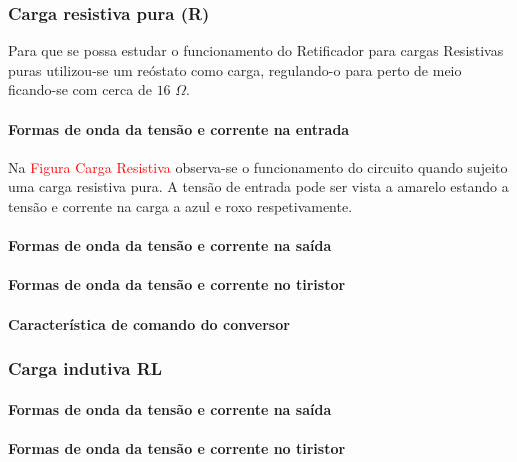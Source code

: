 \documentclass[a4paper,11pt]{article}
\numberwithin{equation}{section}
\begin{document}
\subsubsection{Carga resistiva pura (R)}

Para que se possa estudar o funcionamento do Retificador para cargas Resistivas puras utilizou-se um reóstato como carga, regulando-o para perto de meio ficando-se com cerca de $16$ $\Omega$.

\paragraph{Formas de onda da tensão e corrente na entrada}


Na \textcolor{red}{Figura Carga Resistiva} observa-se o funcionamento do circuito quando sujeito uma carga resistiva pura. A tensão de entrada pode ser vista a amarelo estando a tensão e corrente na carga a azul e roxo respetivamente.

\paragraph{Formas de onda da tensão e corrente na saída}



\paragraph{Formas de onda da tensão e corrente no tiristor}


\paragraph{Característica de comando do conversor}


\subsubsection{Carga indutiva RL}

\paragraph{Formas de onda da tensão e corrente na saída}


\paragraph{Formas de onda da tensão e corrente no tiristor}
\end{document}
